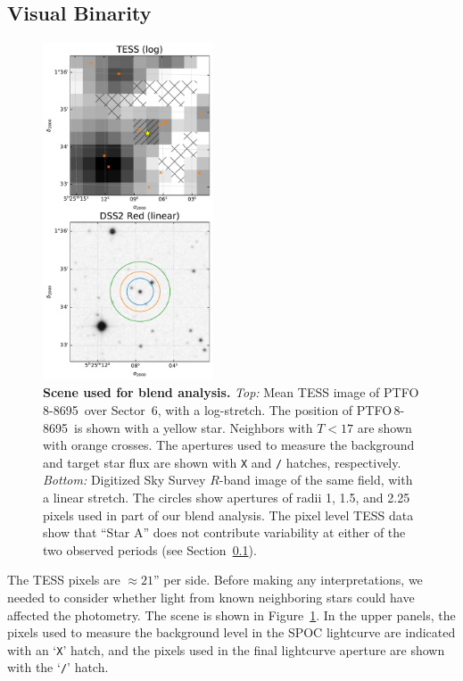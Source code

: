 \documentclass[12pt,twocolumn,tighten]{aastex62}
\newcommand{\ptfo}{PTFO$\,$8-8695}
\begin{document}
\subsection{Visual Binarity}
\label{subsec:blend}

\begin{figure}[t]
	\begin{center}
		\leavevmode
		\includegraphics[width=0.45\textwidth]{f4.pdf}
	\end{center}
	\vspace{-0.7cm}
	\caption{ {\bf Scene used for blend analysis.}
		{\it Top:} Mean TESS image of \ptfo\ over Sector~6, with a
		log-stretch.  The position of \ptfo\ is shown with a yellow
		star.  Neighbors with $T<17$ are shown with orange crosses.  The
		apertures used to measure the background and target star flux are
		shown with \texttt{X} and \texttt{/} hatches, respectively.
		{\it Bottom:} Digitized Sky Survey $R$-band image of the same
		field, with a linear stretch. The circles show apertures of radii
		1, 1.5, and 2.25 pixels used in part of our blend analysis.  The
		pixel level TESS data show that ``Star A''  does not contribute
		variability at either of the two observed periods (see
		Section~\ref{subsec:blend}).
		\label{fig:scene}
	}
\end{figure}


The TESS pixels are $\approx21$'' per side. Before making any
interpretations, we needed to consider whether light from known neighboring
stars could have affected the photometry.  The scene is shown in
Figure~\ref{fig:scene}.  
In the upper panels, the pixels used to measure the background
level in the SPOC lightcurve are indicated with an `\texttt{X}'
hatch, and the pixels used in the final lightcurve aperture are shown
with the `\texttt{/}' hatch.
\end{document}
